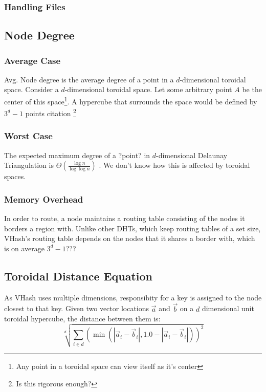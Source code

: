 \documentclass{IEEEtran}
\begin{document}
\subsubsection{Handling Files}

\subsection{Node Degree}

\subsubsection{Average Case}
Avg. Node degree is the average degree of a point in a $d$-dimensional toroidal space.  
Consider a $d$-dimensional toroidal space.  Let some arbitrary point $A$ be the center of this space\footnote{Any point in a toroidal space can view itself as it's center}.  A hypercube that surrounds the space would be defined by $3^d -1$ points citation \footnote{Is this rigorous enough?}

\subsubsection{Worst Case}


The expected maximum degree of a ?point?  in $d$-dimensional Delaunay Triangulation is $\Theta(\frac{\log n}{\log \log n} )$ \cite{bern1991expected}.  We don't know how this is affected by toroidal spaces.



\subsubsection{Memory Overhead}
In order to route, a node maintains a routing table consisting of the nodes it borders a region with.  Unlike other DHTs, which keep routing tables of a set size, VHash's routing table depends on the nodes that it shares a border with, which is on average $3^d -1$???


 
\subsection{Toroidal Distance Equation}
As VHash uses multiple dimensions, responsibity for a key is assigned to the node closest to that key. Given two vector locations $\vec{a}$ and $\vec{b}$ on a  $d$ dimensional unit toroidal hypercube, the distance between them is:
\[  \sqrt[d]{\sum\limits_{i\in d} (\min(|\vec{a}_i-\vec{b}_i|, 1.0-|\vec{a}_i-\vec{b}_i|))^2}\]
\end{document}
